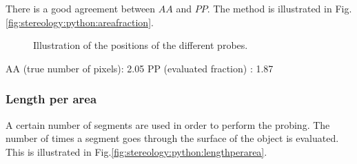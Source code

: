 
There is a good agreement between $AA$ and $PP$. The method is illustrated in Fig.\ref{fig:stereology:python:areafraction}.

\begin{figure}[htbp]
 \centering\caption{Illustration of the positions of the different probes.}%
 \hfill
 \label{fig:stereology:python:fractions}%
\end{figure}


\begin{sh}
AA (true number of pixels): 2.05%
PP (evaluated fraction)   : 1.87%
\end{sh}

\subsubsection{Length per area}
A certain number of segments are used in order to perform the probing. The number of times a segment goes through the surface of the object is evaluated. This is illustrated in Fig.\ref{fig:stereology:python:lengthperarea}.


